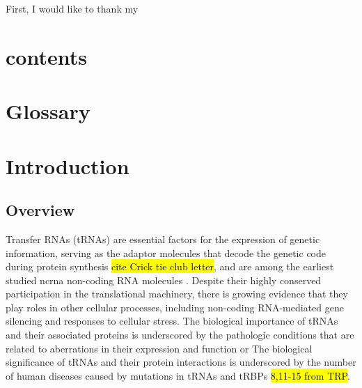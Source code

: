 \documentclass[12pt]{rockefeller}
\begin{document}
First, I would like to thank my  

\chapter*{contents}
\renewcommand\contentsname{Table of Contents}
\tableofcontents
\cleardoublepage
{}
{}
\listoffigures
\cleardoublepage
{}
{}
\listoftables

\chapter*{Glossary}
\printglossary[type=\acronymtype,nonumberlist,title={List of Abbreviations}]

\mainmatter
\pagestyle{fancy}
\fancyhf{}
\lhead{\chaptername\ \thechapter}
\rhead{\thesection}
\rfoot{\thepage}

\chapter{Introduction}
\section{Overview}
Transfer RNAs (tRNAs) are essential factors for the expression of genetic information, serving as the adaptor molecules that decode the genetic code during protein synthesis \hl{cite Crick tie club letter}, and are among the earliest studied \gls{ncrna} non-coding RNA molecules \cite{Woese:1967, Soll:1995}. Despite their highly conserved participation in the translational machinery, there is growing evidence that they play roles in other cellular processes, including non-coding RNA-mediated gene silencing and responses to cellular stress. The biological importance of tRNAs and their associated proteins is underscored by the pathologic conditions that are related to aberrations in their expression and function or The biological significance of tRNAs and their protein interactions is underscored by the number of human diseases caused by mutations in tRNAs and tRBPs \hl{8,11-15 from TRP}. 
\end{document}
